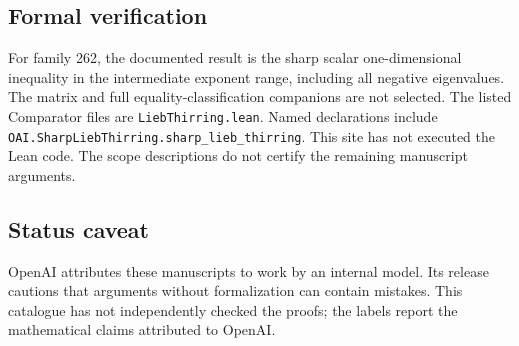 \documentclass[11pt]{article}
\begin{document}
\subsection{Formal verification}
For family 262, the documented result is the sharp scalar one-dimensional inequality in the intermediate exponent range, including all negative eigenvalues. The matrix and full equality-classification companions are not selected. The listed Comparator files are \texttt{LiebThirring.lean}. Named declarations include \texttt{OAI.SharpLiebThirring.sharp\_lieb\_thirring}. This site has not executed the Lean code. The scope descriptions do not certify the remaining manuscript arguments.

\subsection{Status caveat}
OpenAI attributes these manuscripts to work by an internal model. Its release cautions that arguments without formalization can contain mistakes. This catalogue has not independently checked the proofs; the labels report the mathematical claims attributed to OpenAI.
\end{document}
